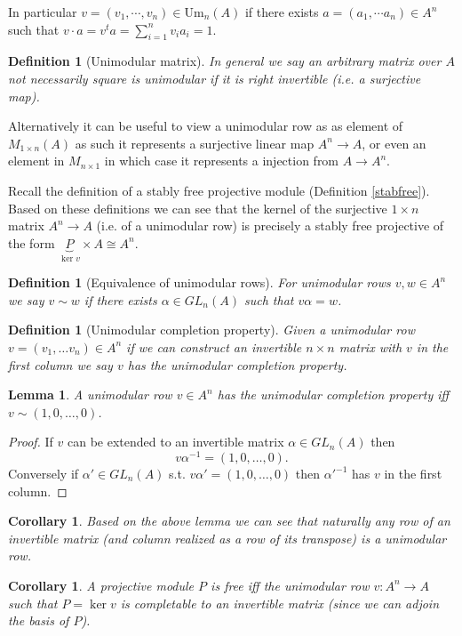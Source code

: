 \documentclass[12pt]{report}
\numberwithin{equation}{section}
\newcounter{dummy} \numberwithin{dummy}{section}
\newtheorem{definition}[dummy]{Definition}
\newtheorem{corollary}[dummy]{Corollary}
\newtheorem{lemma}[dummy]{Lemma}
\begin{document}
	In particular $v=(v_1, \cdots, v_n) \in \mathrm{Um}_n(A) $ if there exists $a=(a_1, \cdots a_n) \in A^n$ such that $ v \cdot a = v^t a = \sum_{i=1}^n v_i a_i = 1$.
	\begin{definition}[Unimodular matrix]
		In general we say an arbitrary matrix over $A$ not necessarily square is unimodular if it is right invertible (i.e. a surjective map).
	\end{definition}
	Alternatively it can be useful to view a unimodular row as as element of $M_{1 \times n} (A) $ as such it represents a surjective linear map $A^n \to A$, or even an element in $M_{n \times 1}$ in which case it represents a injection from $A \to A^n$.
	
	Recall the definition of a stably free projective module (Definition \ref{stabfree}). Based on these definitions we can see that the kernel of the surjective $1 \times n $ matrix $A^n \to A$ (i.e. of a unimodular row) is precisely a stably free projective of the form $\underbrace{P}_{\ker v} \times A \cong A^n$.
	
	
	
	\begin{definition}[Equivalence of unimodular rows]
		For unimodular rows $v,w\in A^n$ we say $v \sim w $ if there exists $ \alpha \in GL_n(A)$ such that $v\alpha =w$.
	\end{definition}
	
	\begin{definition}[Unimodular completion property]
		Given a unimodular row $v=(v_1,\dots v_n) \in A^n$ if we can construct an invertible $n \times n $  matrix with $v$ in the first column we say $v$ has the unimodular completion property.
	\end{definition}
	

	
	\begin{lemma}
		A unimodular row $v \in A^n$ has the unimodular completion property iff $v \sim (1,0,\dots ,0)$.
	\end{lemma}
	\begin{proof}
		If $v$ can be extended to an invertible matrix $\alpha \in GL_n(A)$ then \[ v\alpha^{-1}  = (1,0,\dots, 0). \]
		Conversely if $\alpha' \in GL_n(A) $ s.t. $v\alpha'=(1,0,\dots,0)$ then $\alpha'^{-1}$ has $v$ in the first column.
	\end{proof}
		\begin{corollary}\label{row-of-inv-mat-unimod}
		Based on the above lemma we can see that naturally any row of an invertible matrix (and column realized as a row of its transpose) is a unimodular row. 
	\end{corollary}
	\begin{corollary}
		A projective module $P$ is free iff the unimodular row $v: A^n \to A$ such that $P=\ker v$ is completable to an invertible matrix (since we can adjoin the basis of $P$).
	\end{corollary}
	
\end{document}
